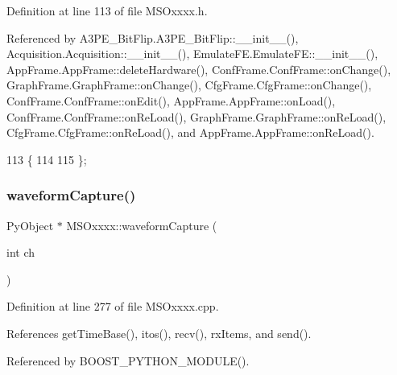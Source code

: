 Definition at line 113 of file M\+S\+Oxxxx.\+h.



Referenced by A3\+P\+E\+\_\+\+Bit\+Flip.\+A3\+P\+E\+\_\+\+Bit\+Flip\+::\+\_\+\+\_\+init\+\_\+\+\_\+(), Acquisition.\+Acquisition\+::\+\_\+\+\_\+init\+\_\+\+\_\+(), Emulate\+F\+E.\+Emulate\+F\+E\+::\+\_\+\+\_\+init\+\_\+\+\_\+(), App\+Frame.\+App\+Frame\+::delete\+Hardware(), Conf\+Frame.\+Conf\+Frame\+::on\+Change(), Graph\+Frame.\+Graph\+Frame\+::on\+Change(), Cfg\+Frame.\+Cfg\+Frame\+::on\+Change(), Conf\+Frame.\+Conf\+Frame\+::on\+Edit(), App\+Frame.\+App\+Frame\+::on\+Load(), Conf\+Frame.\+Conf\+Frame\+::on\+Re\+Load(), Graph\+Frame.\+Graph\+Frame\+::on\+Re\+Load(), Cfg\+Frame.\+Cfg\+Frame\+::on\+Re\+Load(), and App\+Frame.\+App\+Frame\+::on\+Re\+Load().


\begin{DoxyCode}
113                  \{
114     
115   \};
\end{DoxyCode}
\mbox{\label{classMSOxxxx_aed78c680bcec9e14a88eedf7b291518c}} 
\subsubsection{\texorpdfstring{waveform\+Capture()}{waveformCapture()}}
{\footnotesize\ttfamily Py\+Object $\ast$ M\+S\+Oxxxx\+::waveform\+Capture (\begin{DoxyParamCaption}\item[{int}]{ch }\end{DoxyParamCaption})}



Definition at line 277 of file M\+S\+Oxxxx.\+cpp.



References get\+Time\+Base(), itos(), recv(), rx\+Items, and send().



Referenced by B\+O\+O\+S\+T\+\_\+\+P\+Y\+T\+H\+O\+N\+\_\+\+M\+O\+D\+U\+L\+E().


